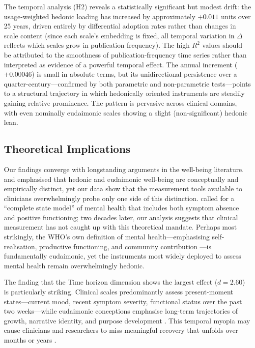 \documentclass[12pt,a4paper]{article}
\begin{document}
The temporal analysis (H2) reveals a statistically significant but modest drift: the usage-weighted hedonic loading has increased by approximately $+0.011$ units over 25 years, driven entirely by differential adoption rates rather than changes in scale content (since each scale's embedding is fixed, all temporal variation in $\Delta$ reflects which scales grow in publication frequency).
The high $R^2$ values should be attributed to the smoothness of publication-frequency time series rather than interpreted as evidence of a powerful temporal effect.
The annual increment ($+0.00046$) is small in absolute terms, but its unidirectional persistence over a quarter-century---confirmed by both parametric and non-parametric tests---points to a structural trajectory in which hedonically oriented instruments are steadily gaining relative prominence.
The pattern is pervasive across clinical domains, with even nominally eudaimonic scales showing a slight (non-significant) hedonic lean.

\subsection{Theoretical Implications}

Our findings converge with longstanding arguments in the well-being literature.
\citet{ryan2001happiness} and \citet{deci2000self} emphasised that hedonic and eudaimonic well-being are conceptually and empirically distinct, yet our data show that the measurement tools available to clinicians overwhelmingly probe only one side of this distinction.
\citet{keyes2002mental} called for a ``complete state model'' of mental health that includes both symptom absence and positive functioning; two decades later, our analysis suggests that clinical measurement has not caught up with this theoretical mandate.
Perhaps most strikingly, the WHO's own definition of mental health---emphasising self-realisation, productive functioning, and community contribution \citep{who2004mental}---is fundamentally eudaimonic, yet the instruments most widely deployed to assess mental health remain overwhelmingly hedonic.

The finding that the Time horizon dimension shows the largest effect ($d = 2.60$) is particularly striking.
Clinical scales predominantly assess present-moment states---current mood, recent symptom severity, functional status over the past two weeks---while eudaimonic conceptions emphasise long-term trajectories of growth, narrative identity, and purpose development
\citep{mcadams2001psychology, king2004benefit}.
This temporal myopia may cause clinicians and researchers to miss meaningful recovery that unfolds over months or years
\citep{tedeschi2004posttraumatic}.
\end{document}
